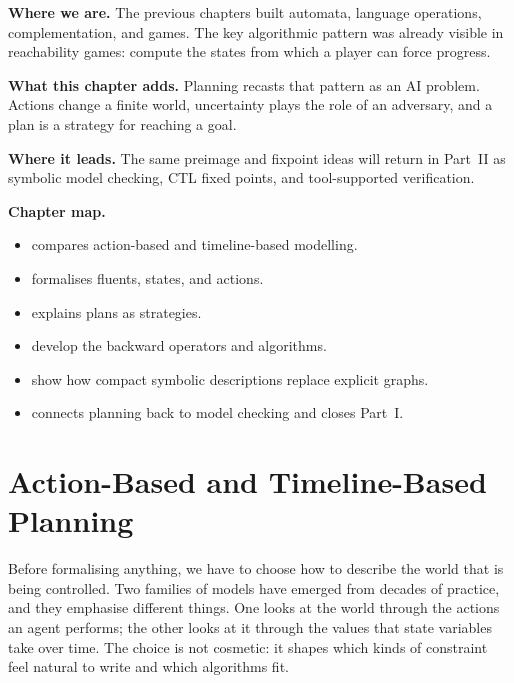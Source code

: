 \begin{chapteropening}
\textbf{Where we are.}  The previous chapters built automata, language
operations, complementation, and games.  The key algorithmic pattern was
already visible in reachability games: compute the states from which a player
can force progress.

\textbf{What this chapter adds.}  Planning recasts that pattern as an AI
problem.  Actions change a finite world, uncertainty plays the role of an
adversary, and a plan is a strategy for reaching a goal.

\textbf{Where it leads.}  The same preimage and fixpoint ideas will return in
Part~II as symbolic model checking, CTL fixed points, and tool-supported
verification.

\textbf{Chapter map.}
\begin{itemize}[nosep]
  \item {} compares action-based and
        timeline-based modelling.
  \item {} formalises fluents, states, and actions.
  \item {} explains plans as strategies.
  \item {} develop the
        backward operators and algorithms.
  \item {} show how
        compact symbolic descriptions replace explicit graphs.
  \item {} connects planning back to model
        checking and closes Part~I.
\end{itemize}
\end{chapteropening}

\section{Action-Based and Timeline-Based Planning}
\label{sec:action-vs-timeline-planning}

Before formalising anything, we have to choose how to describe the
world that is being controlled.  Two families of models have emerged
from decades of practice, and they emphasise different things.  One
looks at the world through the actions an agent performs; the other
looks at it through the values that state variables take over time.
The choice is not cosmetic: it shapes which kinds of constraint feel
natural to write and which algorithms fit.

